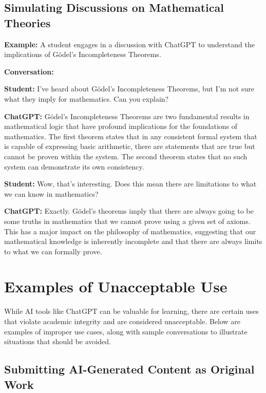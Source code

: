 \documentclass{article}
\begin{document}
\subsection{Simulating Discussions on Mathematical Theories}

\textbf{Example:} A student engages in a discussion with ChatGPT to understand the implications of G\"{o}del's Incompleteness Theorems.

\textbf{Conversation:}

\begin{mdframed}
\begin{flushleft}
\textbf{Student:} I've heard about G\"{o}del's Incompleteness Theorems, but I'm not sure what they imply for mathematics. Can you explain?

\textbf{ChatGPT:} G\"{o}del's Incompleteness Theorems are two fundamental results in mathematical logic that have profound implications for the foundations of mathematics. The first theorem states that in any consistent formal system that is capable of expressing basic arithmetic, there are statements that are true but cannot be proven within the system. The second theorem states that no such system can demonstrate its own consistency.

\textbf{Student:} Wow, that's interesting. Does this mean there are limitations to what we can know in mathematics?

\textbf{ChatGPT:} Exactly. G\"{o}del's theorems imply that there are always going to be some truths in mathematics that we cannot prove using a given set of axioms. This has a major impact on the philosophy of mathematics, suggesting that our mathematical knowledge is inherently incomplete and that there are always limits to what we can formally prove.
\end{flushleft}
\end{mdframed}




\section{Examples of Unacceptable Use}

While AI tools like ChatGPT can be valuable for learning, there are certain uses that violate academic integrity and are considered unacceptable. Below are examples of improper use cases, along with sample conversations to illustrate situations that should be avoided.

\subsection{Submitting AI-Generated Content as Original Work}
\end{document}
